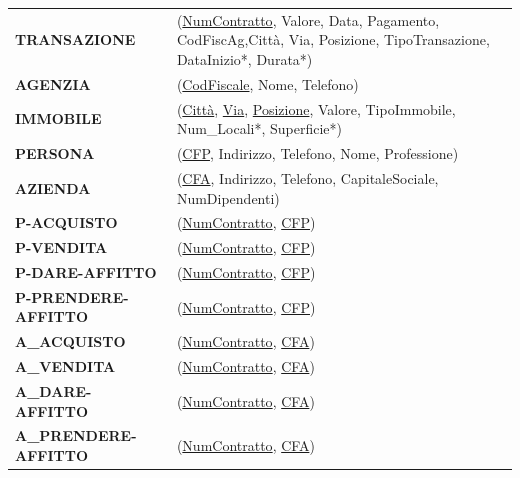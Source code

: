 \documentclass{article}
\begin{document}
\begin{tabular}{ll}
	\textbf{TRANSAZIONE} & (\underline{NumContratto}, Valore, Data, Pagamento, CodFiscAg,Città, Via, Posizione, TipoTransazione, DataInizio*, Durata*) \\
	
	\textbf{AGENZIA} & (\underline{CodFiscale}, Nome, Telefono) \\
	
	\textbf{IMMOBILE} & (\underline{Città}, \underline{Via}, \underline{Posizione}, Valore, TipoImmobile, Num\_Locali*, Superficie*) \\
	
	\textbf{PERSONA} & (\underline{CFP}, Indirizzo, Telefono, Nome, Professione) \\
	
	\textbf{AZIENDA} & (\underline{CFA}, Indirizzo, Telefono, CapitaleSociale, NumDipendenti) \\
	
	\textbf{P-ACQUISTO} & (\underline{NumContratto}, \underline{CFP}) \\
	
	\textbf{P-VENDITA} & (\underline{NumContratto}, \underline{CFP}) \\
	
	\textbf{P-DARE-AFFITTO} & (\underline{NumContratto}, \underline{CFP}) \\
	
	\textbf{P-PRENDERE-AFFITTO} & (\underline{NumContratto}, \underline{CFP}) \\
	
	\textbf{A\_ACQUISTO} & (\underline{NumContratto}, \underline{CFA}) \\
	
	\textbf{A\_VENDITA} & (\underline{NumContratto}, \underline{CFA}) \\
	
	\textbf{A\_DARE-AFFITTO} & (\underline{NumContratto}, \underline{CFA}) \\
	
	\textbf{A\_PRENDERE-AFFITTO} & (\underline{NumContratto}, \underline{CFA}) \\
\end{tabular}
\end{document}
